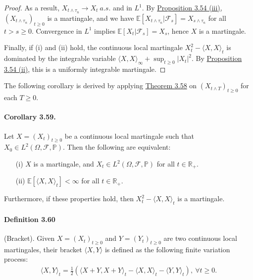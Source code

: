 \documentclass{article}
\numberwithin{equation}{section}
\newcommand{\E}{\mathbb{E}}
\renewcommand{\P}{\mathbb{P}}
\theoremstyle{plain}
\theoremstyle{definition}
\begin{document}
\begin{proof}
As a result, $X_{t\wedge\tau_n}\to X_t\ a.s.$ and in $L^1$. By \hyperref[prop:3.54]{Proposition 3.54 (iii)}, $(X_{t\wedge\tau_n})_{t\geq 0}$ is a martingale, and we have $\E[X_{t\wedge\tau_n}|\mathscr{F}_s]=X_{s\wedge\tau_n}$ for all $t>s\geq 0$. Convergence in $L^1$ implies $\E[X_t|\mathscr{F}_s]=X_s$, hence $X$ is a martingale.

Finally, if (i) and (ii) hold, the continuous local martingale $X_t^2-\langle X,X\rangle_t$ is dominated by the integrable variable $\langle X,X\rangle_\infty + \sup_{t\geq 0}\vert X_t\vert^2$. By \hyperref[prop:3.54]{Proposition 3.54 (ii)}, this is a uniformly integrable martingale.
\end{proof}

The following corollary is derived by applying \hyperref[thm:3.58]{Theorem 3.58} on $(X_{t\wedge T})_{t\geq 0}$ for each $T\geq 0$.

\paragraph{Corollary 3.59.\label{cor:3.59}} Let $X=(X_t)_{t\geq 0}$ be a continuous local martingale such that $X_0\in L^2(\Omega,\mathscr{F},\P)$. Then the following are equivalent:
\begin{itemize}
	\item[(i)] $X$ is a martingale, and $X_t\in L^2(\Omega,\mathscr{F},\P)$ for all $t\in\mathbb{R}_+$.
	\item[(ii)] $\E\left[\langle X,X\rangle_t\right]<\infty$ for all $t\in\mathbb{R}_+$.
\end{itemize}
Furthermore, if these properties hold, then $X_t^2-\langle X,X\rangle_t$ is a martingale.

\paragraph{Definition 3.60\label{def:3.60}} (Bracket). Given $X=(X_t)_{t\geq 0}$ and $Y=(Y_t)_{t\geq 0}$ are two continuous local martingales, their bracket $\langle X,Y\rangle$ is defined as the following finite variation process:
\begin{align*}
	\langle X,Y\rangle_t = \frac{1}{2}\left(\langle X+Y,X+Y\rangle_t - \langle X,X\rangle_t - \langle Y,Y\rangle_t\right),\ \forall t\geq 0.
\end{align*}
\end{document}
